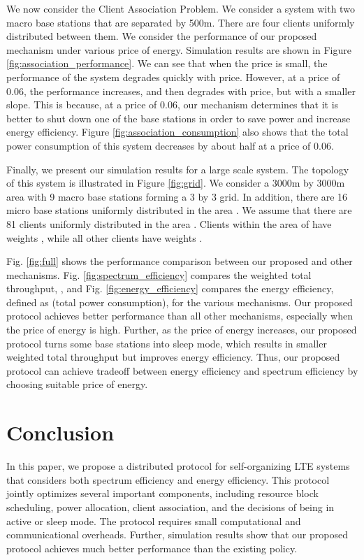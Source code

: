 \documentclass[conference]{IEEEtran}
\begin{document}
We now consider the Client Association Problem. We consider a system with two macro base stations that are separated by 500m. There are four clients uniformly distributed between them. We consider the performance of our proposed mechanism under various price of energy. Simulation results are shown in Figure \ref{fig:association_performance}. We can see that when the price is small, the performance of the system degrades quickly with price. However, at a price of 0.06, the performance increases, and then degrades with price, but with a smaller slope. This is because, at a price of 0.06, our mechanism determines that it is better to shut down one of the base stations in order to save power and increase energy efficiency. Figure \ref{fig:association_consumption} also shows that the total power consumption of this system decreases by about half at a price of 0.06.

Finally, we present our simulation results for a large scale system. The topology of this system is illustrated in Figure \ref{fig:grid}. We consider a 3000m by 3000m area with 9 macro base stations forming a 3 by 3 grid. In addition, there are 16 micro base stations uniformly distributed in the area . We assume that there are 81 clients uniformly distributed in the area . Clients within the area of  have weights , while all other clients have weights .

Fig. \ref{fig:full} shows the performance comparison between our proposed and other mechanisms. Fig. \ref{fig:spectrum_efficiency} compares the weighted total throughput, , and Fig. \ref{fig:energy_efficiency} compares the energy efficiency, defined as (total power consumption), for the various mechanisms. Our proposed protocol achieves better performance than all other mechanisms, especially when the price of energy is high. Further, as the price of energy increases, our proposed protocol turns some base stations into sleep mode, which results in smaller weighted total throughput but improves energy efficiency. Thus, our proposed protocol can achieve tradeoff between energy efficiency and spectrum efficiency by choosing suitable price of energy.




\section{Conclusion}    \label{section:conclusion}

In this paper, we propose a distributed protocol for self-organizing LTE systems that considers both spectrum efficiency and energy efficiency. This protocol jointly optimizes several important components, including resource block scheduling, power allocation, client association, and the decisions of being in active or sleep mode. The protocol requires small computational and communicational overheads. Further, simulation results show that our proposed protocol achieves much better performance than the existing policy.
\end{document}
